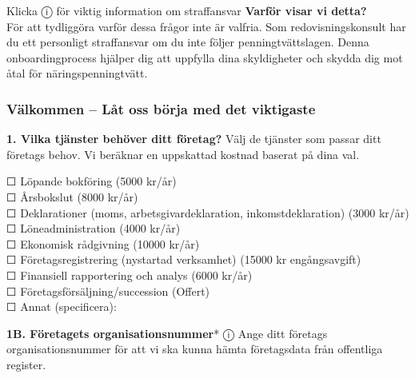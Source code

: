 \documentclass[10pt]{beamer}
\begin{document}
\begin{alertblock}{Klicka ⓘ för viktig information om straffansvar}
  \tiny \textbf{Varför visar vi detta?}\\
  \tiny För att tydliggöra varför dessa frågor inte är valfria. Som redovisningskonsult 
  har du ett personligt straffansvar om du inte följer penningtvättslagen. Denna 
  onboardingprocess hjälper dig att uppfylla dina skyldigheter och skydda dig mot 
  åtal för näringspenningtvätt.
\end{alertblock}

\begin{frame}[label=intro]
  \frametitle{Välkommen – Låt oss börja med det viktigaste}

  \small
  
  \begin{block}{\textbf{1. Vilka tjänster behöver ditt företag?}}
    \footnotesize
    Välj de tjänster som passar ditt företags behov. Vi beräknar en uppskattad kostnad baserat på dina val.
  \end{block}
  
  \vspace{0.2cm}
  \footnotesize
  ☐ Löpande bokföring (5000 kr/år)\\
  ☐ Årsbokslut (8000 kr/år)\\
  ☐ Deklarationer (moms, arbetsgivardeklaration, inkomstdeklaration) (3000 kr/år)\\
  ☐ Löneadministration (4000 kr/år)\\
  ☐ Ekonomisk rådgivning (10000 kr/år)\\
  ☐ Företagsregistrering (nystartad verksamhet) (15000 kr engångsavgift)\\
  ☐ Finansiell rapportering och analys (6000 kr/år)\\
  ☐ Företagsförsäljning/succession (Offert)\\
  ☐ Annat (specificera): \underline{\hspace{5cm}}
  
  \vspace{0.5cm}
  
  \begin{block}{\textbf{1B. Företagets organisationsnummer}* \hspace{0.3cm} ⓘ}
    \footnotesize
    Ange ditt företags organisationsnummer för att vi ska kunna hämta företagsdata från offentliga register.
  \end{block}
  

\end{frame}
\end{document}
